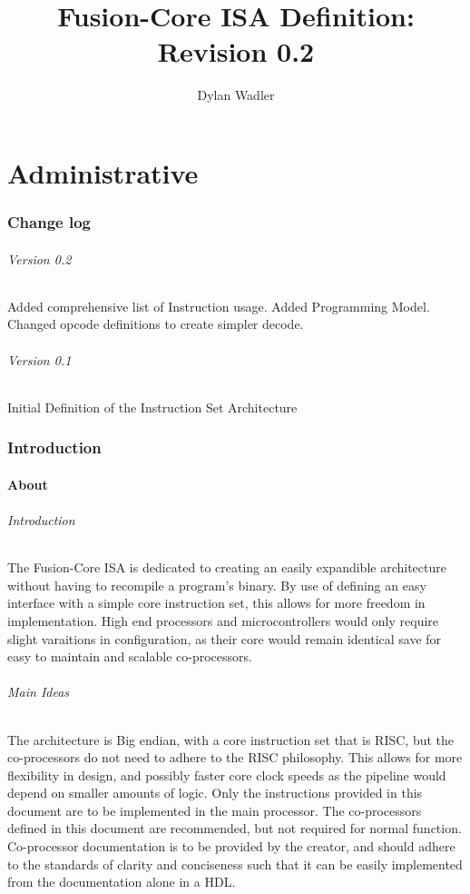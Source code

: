 \documentclass[letterpaper, 11pt]{article}
\title{Fusion-Core ISA Definition: Revision 0.2}
\author{Dylan Wadler}
\begin{document}
\maketitle
\newpage
\tableofcontents


\newpage
\part{Administrative}
\section{Change log}
\paragraph{Version 0.2} Added comprehensive list of Instruction usage. Added Programming Model. Changed opcode definitions to create simpler
decode.
\paragraph{Version 0.1} Initial Definition of the Instruction Set Architecture

\section{Introduction}

\subsection{About}
\paragraph{Introduction}The Fusion-Core ISA is dedicated to creating an easily expandible architecture without having to 
recompile a program's binary. By use of defining an easy interface with a simple core instruction set, this allows for
more freedom in implementation. High end processors and microcontrollers would only require slight varaitions in
configuration, as their core would remain identical save for easy to maintain and scalable co-processors.
\paragraph{Main Ideas}The architecture is Big endian, with a core instruction set that is RISC, but the co-processors do not need to adhere to the RISC philosophy. This allows for more flexibility in design, and possibly faster core clock speeds as the pipeline would depend on smaller amounts of logic. Only the instructions provided in this document are to be implemented in the main processor. The co-processors defined in this document are recommended, but not required for normal function. Co-processor documentation is to be provided by the creator, and should adhere to the standards of clarity and conciseness such that it can be easily implemented from the documentation alone in a HDL. 
\end{document}
